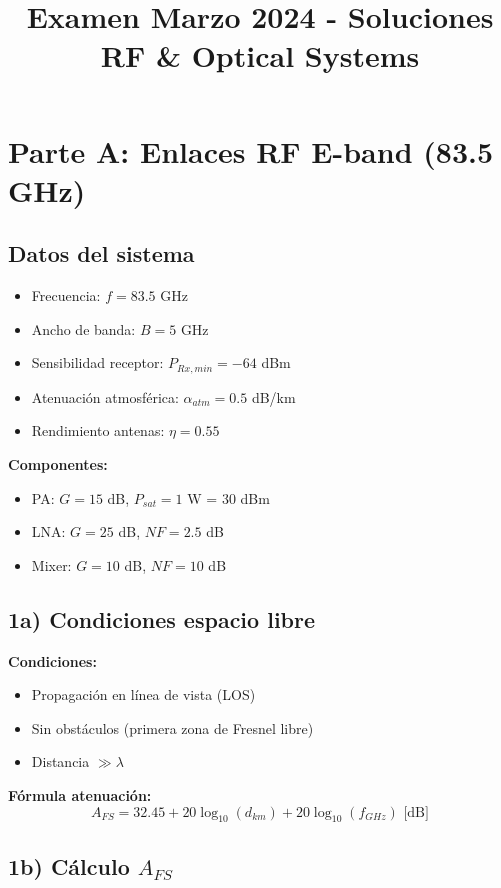 \documentclass[a4paper,11pt]{article}
\title{\textbf{Examen Marzo 2024 - Soluciones\\RF \& Optical Systems}}
\author{}
\date{}
\begin{document}
\maketitle

\section*{Parte A: Enlaces RF E-band (83.5 GHz)}

\subsection*{Datos del sistema}
\begin{itemize}
    \item Frecuencia: $f = 83.5$ GHz
    \item Ancho de banda: $B = 5$ GHz
    \item Sensibilidad receptor: $P_{Rx,min} = -64$ dBm
    \item Atenuación atmosférica: $\alpha_{atm} = 0.5$ dB/km
    \item Rendimiento antenas: $\eta = 0.55$
\end{itemize}

\textbf{Componentes:}
\begin{itemize}
    \item PA: $G = 15$ dB, $P_{sat} = 1$ W = 30 dBm
    \item LNA: $G = 25$ dB, $NF = 2.5$ dB
    \item Mixer: $G = 10$ dB, $NF = 10$ dB
\end{itemize}

\subsection*{1a) Condiciones espacio libre}
\textbf{Condiciones:}
\begin{itemize}
    \item Propagación en línea de vista (LOS)
    \item Sin obstáculos (primera zona de Fresnel libre)
    \item Distancia $\gg \lambda$
\end{itemize}

\textbf{Fórmula atenuación:}
$$A_{FS} = 32.45 + 20\log_{10}(d_{km}) + 20\log_{10}(f_{GHz}) \text{ [dB]}$$

\subsection*{1b) Cálculo $A_{FS}$}
\end{document}

